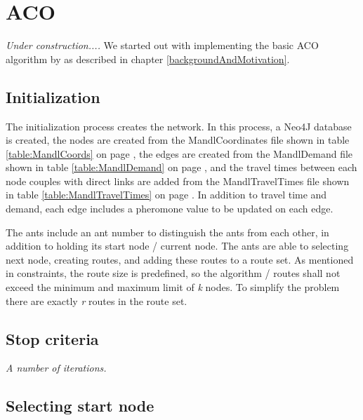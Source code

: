 \section{ACO}

\textit{Under construction....}
\newline
We started out with implementing the basic ACO algorithm by \citet{nanda11} as described in chapter \ref{backgroundAndMotivation}.

\subsection{Initialization}

The initialization process creates the network. In this process, a Neo4J database is created, the nodes are created from the MandlCoordinates file shown in table \ref{table:MandlCoords} on page \pageref{table:MandlCoords}, the edges are created from the MandlDemand file shown in table \ref{table:MandlDemand} on page \pageref{table:MandlDemand}, and the travel times between each node couples with direct links are added from the MandlTravelTimes file shown in table \ref{table:MandlTravelTimes} on page \pageref{table:MandlTravelTimes}. In addition to travel time and demand, each edge includes a pheromone value to be updated on each edge.
\par
The ants include an ant number to distinguish the ants from each other, in addition to holding its start node / current node. The ants are able to selecting next node, creating routes, and adding these routes to a route set. As mentioned in constraints, the route size is predefined, so the algorithm / routes shall not exceed the minimum and maximum limit of \textit{k} nodes. To simplify the problem there are exactly \textit{r} routes in the route set.

\subsection{Stop criteria}

\textit{A number of iterations.}

\subsection{Selecting start node}
\begin{algorithm}[H]

 
\end{algorithm}

